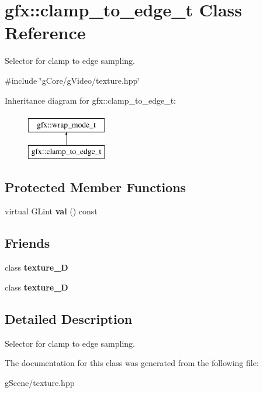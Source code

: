 \hypertarget{classgfx_1_1clamp__to__edge__t}{\section{gfx\-:\-:clamp\-\_\-to\-\_\-edge\-\_\-t Class Reference}
\label{classgfx_1_1clamp__to__edge__t}
}


Selector for clamp to edge sampling.  




{\ttfamily \#include \char`\"{}g\-Core/g\-Video/texture.\-hpp\char`\"{}}

Inheritance diagram for gfx\-:\-:clamp\-\_\-to\-\_\-edge\-\_\-t\-:\begin{figure}[H]
\begin{center}
\leavevmode
\includegraphics[height=2.000000cm]{classgfx_1_1clamp__to__edge__t}
\end{center}
\end{figure}
\subsection*{Protected Member Functions}
\begin{DoxyCompactItemize}
\item 
\hypertarget{classgfx_1_1clamp__to__edge__t_a56f9b6872de12803d9b21b79e8ebce7e}{virtual G\-Lint {\bfseries val} () const }\label{classgfx_1_1clamp__to__edge__t_a56f9b6872de12803d9b21b79e8ebce7e}

\end{DoxyCompactItemize}
\subsection*{Friends}
\begin{DoxyCompactItemize}
\item 
\hypertarget{classgfx_1_1clamp__to__edge__t_a2039d67f6166ccf823c78e3476aad9aa}{class {\bfseries texture\-\_\-D}}\label{classgfx_1_1clamp__to__edge__t_a2039d67f6166ccf823c78e3476aad9aa}

\item 
\hypertarget{classgfx_1_1clamp__to__edge__t_a22ad86ef46c3b17357a0cd59e50bc7dd}{class {\bfseries texture\-\_\-D}}\label{classgfx_1_1clamp__to__edge__t_a22ad86ef46c3b17357a0cd59e50bc7dd}

\end{DoxyCompactItemize}


\subsection{Detailed Description}
Selector for clamp to edge sampling. 

The documentation for this class was generated from the following file\-:\begin{DoxyCompactItemize}
\item 
g\-Scene/texture.\-hpp\end{DoxyCompactItemize}
